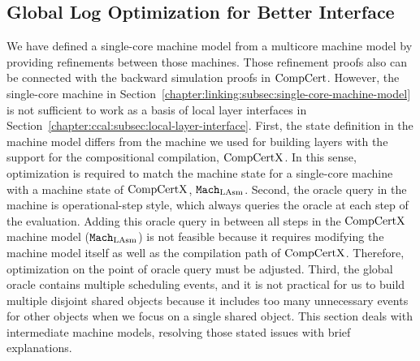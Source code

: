 
\subsection{Global Log Optimization for Better Interface}
\label{chapter:linking:subsec:global-log-optimization}

We have defined a single-core machine model from a multicore machine model by providing refinements between those machines. 
Those refinement proofs also can be connected with the backward simulation proofs in $\mathrm{CompCert}$. 
However, the single-core machine in Section~\ref{chapter:linking:subsec:single-core-machine-model} 
is not sufficient to work as a 
basis of local layer interfaces in Section~\ref{chapter:ccal:subsec:local-layer-interface}. 
First, the state definition in the machine model differs from the machine  we used for building layers with the support for the compositional compilation, $\mathrm{CompCertX}$. 
In this sense, optimization is required to match the machine state for a single-core machine with a machine state of $\mathrm{CompCertX}$, ${\mathrm{\texttt{Mach}}}_{\mathrm{LAsm}}$. 
Second, the oracle query in the machine is operational-step style, 
which always queries the oracle at each step of the evaluation.
Adding this oracle query in between all steps in the $\mathrm{CompCertX}$ machine model (${\mathrm{\texttt{Mach}}}_{\mathrm{LAsm}}$) is not feasible because it requires modifying the machine model itself as well as the compilation path of $\mathrm{CompCertX}$. 
Therefore, 
optimization on the point of oracle query must be adjusted. 
Third, the global oracle contains multiple scheduling events, and it is not practical for us to build multiple disjoint shared objects because it includes too many unnecessary events for other objects when we focus on a single shared object. 
This section deals with intermediate machine models, resolving those stated issues with brief explanations. 



